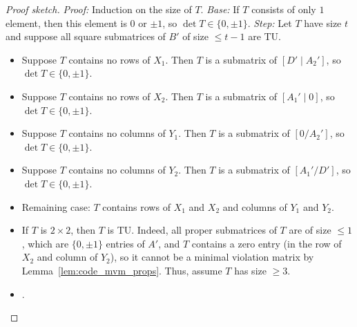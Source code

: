 \begin{proof}[Proof sketch]
  \emph{Proof:} Induction on the size of $T$.
  \emph{Base:} If $T$ consists of only $1$ element, then this element is $0$ or $\pm 1$, so $\det T \in \{0, \pm 1\}$.
  \emph{Step:} Let $T$ have size $t$ and suppose all square submatrices of $B'$ of size $\leq t - 1$ are TU.
  \begin{itemize}
    \item Suppose $T$ contains no rows of $X_{1}$. Then $T$ is a submatrix of $\left[D' \mid A_{2}' \right]$, so $\det T \in \{0, \pm 1\}$.
    \item Suppose $T$ contains no rows of $X_{2}$. Then $T$ is a submatrix of $\left[A_{1}' \mid 0 \right]$, so $\det T \in \{0, \pm 1\}$.
    \item Suppose $T$ contains no columns of $Y_{1}$. Then $T$ is a submatrix of $\left[0 / A_{2}' \right]$, so $\det T \in \{0, \pm 1\}$.
    \item Suppose $T$ contains no columns of $Y_{2}$. Then $T$ is a submatrix of $\left[ A_{1}' / D' \right]$, so $\det T \in \{0, \pm 1\}$.
    \item Remaining case: $T$ contains rows of $X_{1}$ and $X_{2}$ and columns of $Y_{1}$ and $Y_{2}$.
    \item If $T$ is $2 \times 2$, then $T$ is TU. Indeed, all proper submatrices of $T$ are of size $\leq 1$, which are $\{0, \pm 1\}$ entries of $A'$, and $T$ contains a zero entry (in the row of $X_{2}$ and column of $Y_{2}$), so it cannot be a minimal violation matrix by Lemma~\ref{lem:code_mvm_props}. Thus, assume $T$ has size $\geq 3$.
    \item .
  \end{itemize}
\end{proof}

\begin{lemma}
  \label{lem:code_2_sum_regular_left}
  \leanok
\end{lemma}

\begin{lemma}
  \label{lem:code_2_sum_regular_right}
  \leanok
\end{lemma}
